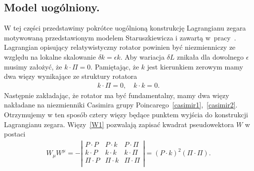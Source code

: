 \subsection{Model uogólniony.}
W tej części przedstawimy pokrótce uogólnioną konstrukcję 
Lagrangianu zegara motywowaną przedstawionym
 modelem Staruszkiewicza i zawartą w~pracy~\cite{Bratek2015wiele}.
Lagrangian opisujący relatywistyczny rotator powinien być 
niezmienniczy ze względu na lokalne skalowanie 
$\delta k =\epsilon k$. Aby wariacja 
$\delta L $ znikała dla dowolnego $\epsilon$ musimy założyć, że
 $k \cdot \Pi = 0$. Pamiętając, że $k$ jest kierunkiem zerowym 
mamy dwa więzy wynikające ze struktury rotatora
\begin{align}\label{W1}
k \cdot \Pi = 0, \quad k \cdot k = 0. \tag{W1}
\end{align}
Następnie zakładając, że rotator ma być fundamentalny, 
mamy dwa więzy nakładane na niezmienniki Casimira 
grupy Poincarego~\ref{casimir1},\ \ref{casimir2}.
Otrzymujemy w ten sposób 
cztery więzy będące punktem wyjścia
do konstrukcji Lagrangianu zegara.
Więzy~\eqref{W1} pozwalają zapisać kwadrat pseudowektora $W$ w postaci
\begin{align*}
W_\mu  W^\mu = 
-\left| 
\begin{array}{ccc}
P\cdot P& P \cdot k& P \cdot \Pi\\
k\cdot P& k \cdot k& k \cdot \Pi\\
\Pi \cdot P& \Pi \cdot k& \Pi \cdot \Pi\\
\end{array}
\right| = 
(P \cdot k)^2  (\Pi \cdot \Pi). \\
\end{align*}

